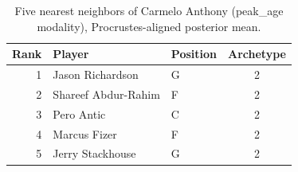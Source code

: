\begin{table}[htbp]
  \centering\small
  \begin{tabular}{rllc}
    \toprule
    Rank & Player & Position & Archetype \\
    \midrule
    1 & Jason Richardson & G & 2 \\
    2 & Shareef Abdur-Rahim & F & 2 \\
    3 & Pero Antic & C & 2 \\
    4 & Marcus Fizer & F & 2 \\
    5 & Jerry Stackhouse & G & 2 \\
    \bottomrule
  \end{tabular}
  \caption{Five nearest neighbors of Carmelo Anthony (peak_age modality), Procrustes-aligned posterior mean.}
  \label{tab:Carmelo_Anthony_neighbors_peak_age}
\end{table}


